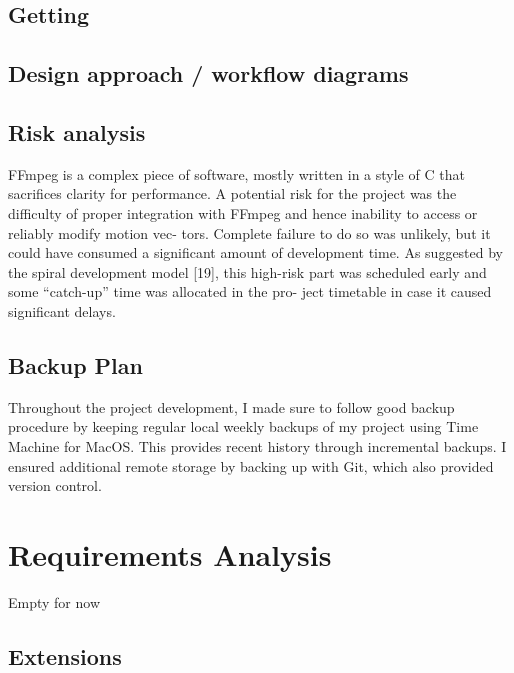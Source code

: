 \subsection{Getting}

\subsection{Design approach / workflow diagrams}
\subsection{Risk analysis}
FFmpeg is a complex piece of software, mostly written in a style of C that sacrifices clarity for performance. A potential risk for the project was the difficulty of proper integration with FFmpeg and hence inability to access or reliably modify motion vec- tors. Complete failure to do so was unlikely, but it could have consumed a significant amount of development time. As suggested by the spiral development model [19], this high-risk part was scheduled early and some “catch-up” time was allocated in the pro- ject timetable in case it caused significant delays.

\subsection{Backup Plan}	
Throughout the project development, I made sure to follow good backup procedure by keeping regular local weekly backups of my project using Time Machine for MacOS. This provides recent history through incremental backups. I ensured additional remote storage by backing up with Git, which also provided version control.
	
\section{Requirements Analysis}
	Empty for now
	\subsection{Extensions}
